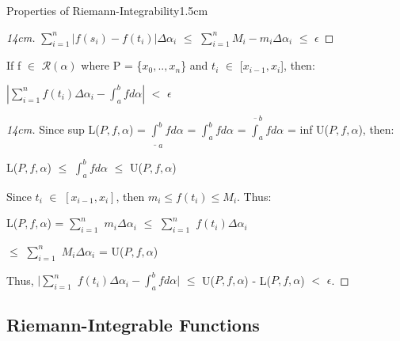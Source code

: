 \begin{ltheorem}{Properties of Riemann-Integrability}{1.5cm}
\begin{proof}[14cm]
                \hspace{0.5cm}
                $\sum_{i=1}^n |f(s_i) - f(t_i)| \Delta \alpha_i$
                $\leq$ $\sum_{i=1}^n M_i - m_i \Delta \alpha_i$
                $\leq$ $\epsilon$    
            \end{proof}

        \item If f $\in$ $\mathscr{R}(\alpha)$ where
            P = \{$x_0,..,x_n$\} and $t_i$ $\in$ [$x_{i-1},x_i$],
            then:
        
            \hspace{1cm}
            $| \sum_{i=1}^n f(t_i) \Delta \alpha_i - \int_a^b f d \alpha |$
            $<$ $\epsilon$

            \begin{proof}[14cm]
                Since
                sup L($P,f,\alpha$) = $\underline{\int}_a^b f d \alpha$
                = $\int_a^b f d \alpha$
                = $\overline{\int}_a^b f d \alpha$ = inf U($P,f,\alpha$), then:

                \hspace{0.5cm}
                L($P,f,\alpha$) $\leq$ $\int_a^b f d \alpha$ $\leq$ U($P,f,\alpha$)

                Since $t_i$ $\in$ $[x_{i-1},x_i]$, then $m_i \leq f(t_i) \leq M_i$.
                Thus:
                
                \hspace{0.5cm}
                L($P,f,\alpha$) = $\sum_{i=1}^n$ $m_i \Delta \alpha_i$
                $\leq$ $\sum_{i=1}^n$ $f(t_i) \Delta \alpha_i$

                \hspace{5.2cm}
                $\leq$ $\sum_{i=1}^n$ $M_i \Delta \alpha_i$ = U($P,f,\alpha$)

                Thus, $| \sum_{i=1}^n$ $f(t_i) \Delta \alpha_i
                - \int_a^b f d \alpha |$
                $\leq$ U($P,f,\alpha$) - L($P,f,\alpha$)
                $<$ $\epsilon$.
            \end{proof}
    \end{ltheorem}

    \newpage





\subsection{ Riemann-Integrable Functions }

